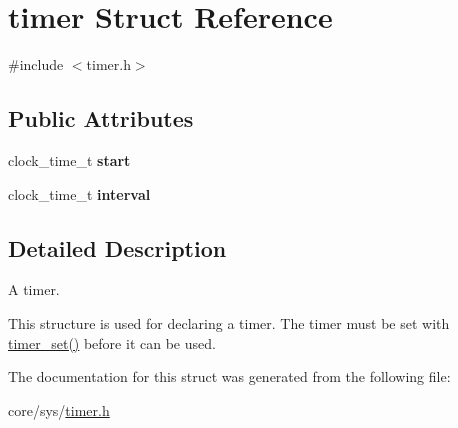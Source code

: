 \hypertarget{structtimer}{\section{timer Struct Reference}
\label{structtimer}
}


{\ttfamily \#include $<$timer.\-h$>$}

\subsection*{Public Attributes}
\begin{DoxyCompactItemize}
\item 
\hypertarget{structtimer_ae8eb428c05bc1dee022246a3063d277c}{clock\-\_\-time\-\_\-t {\bfseries start}}\label{structtimer_ae8eb428c05bc1dee022246a3063d277c}

\item 
\hypertarget{structtimer_afe557d333c06cf65f52023f45f5b0a3a}{clock\-\_\-time\-\_\-t {\bfseries interval}}\label{structtimer_afe557d333c06cf65f52023f45f5b0a3a}

\end{DoxyCompactItemize}


\subsection{Detailed Description}
A timer.

This structure is used for declaring a timer. The timer must be set with \hyperlink{group__timer_ga6614d96fdfcd95c95ec6e6f63071ff51}{timer\-\_\-set()} before it can be used. 

The documentation for this struct was generated from the following file\-:\begin{DoxyCompactItemize}
\item 
core/sys/\hyperlink{timer_8h}{timer.\-h}\end{DoxyCompactItemize}
